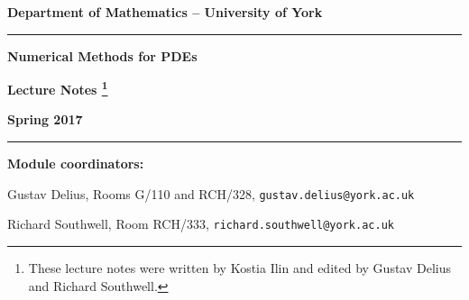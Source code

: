 \documentclass[11pt, a5paper]{article}
\begin{document}
{\Large
\centerline{\bf Department of Mathematics -- University of York}
\vskip 0.5cm

\hrule \vspace*{10mm}


\centerline{\bf Numerical Methods for PDEs}

\medskip
\centerline{\bf Lecture Notes
\footnote{These lecture notes were written by Kostia Ilin and edited by
Gustav Delius and Richard Southwell.}}
\bigskip

\centerline{\bf Spring 2017}
}
\vspace*{10mm}

\hrule
\vspace*{5mm}

 
{\bf Module coordinators:} 

Gustav Delius, Rooms G/110 and RCH/328, {\tt gustav.delius@york.ac.uk}

Richard Southwell, Room RCH/333, {\tt richard.southwell@york.ac.uk}

\tableofcontents












\end{document}
